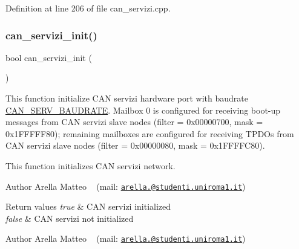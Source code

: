 Definition at line 206 of file can\+\_\+servizi.\+cpp.

\mbox{\label{group___c_a_n__servizi__group_ga2d29bd107e96ae1986e8874f004ffc84}} 
\subsubsection{\texorpdfstring{can\+\_\+servizi\+\_\+init()}{can\_servizi\_init()}}
{\footnotesize\ttfamily bool can\+\_\+servizi\+\_\+init (\begin{DoxyParamCaption}{ }\end{DoxyParamCaption})}



This function initialize C\+AN servizi hardware port with baudrate \mbox{\hyperlink{common_8h_a2a5e84dfc7fa972b75e7ddbc6cc52a45}{C\+A\+N\+\_\+\+S\+E\+R\+V\+\_\+\+B\+A\+U\+D\+R\+A\+TE}}. Mailbox 0 is configured for receiving boot-\/up messages from C\+AN servizi slave nodes (filter = 0x00000700, mask = 0x1\+F\+F\+F\+F\+F80); remaining mailboxes are configured for receiving T\+P\+D\+Os from C\+AN servizi slave nodes (filter = 0x00000080, mask = 0x1\+F\+F\+F\+F\+C80). 

This function initializes C\+AN servizi network.

\begin{DoxyAuthor}{Author}
Arella Matteo ~\newline
 (mail\+: \href{mailto:arella.1646983@studenti.uniroma1.it}{\tt arella.@studenti.\+uniroma1.\+it})
\end{DoxyAuthor}

\begin{DoxyRetVals}{Return values}
{\em true} & C\+AN servizi initialized \\
\hline
{\em false} & C\+AN servizi not initialized\\
\hline
\end{DoxyRetVals}
\begin{DoxyAuthor}{Author}
Arella Matteo ~\newline
 (mail\+: \href{mailto:arella.1646983@studenti.uniroma1.it}{\tt arella.@studenti.\+uniroma1.\+it})
\end{DoxyAuthor}

